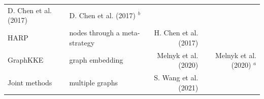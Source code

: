 \documentclass[10pt,oneside]{article}
\begin{document}
\begin{longtable}[]{@{}llrr@{}}
\begin{minipage}[t]{0.16\columnwidth}
D. Chen et al. (2017)\strut
\end{minipage} & \begin{minipage}[t]{0.32\columnwidth}\raggedleft
D. Chen et al. (2017) \(^b\)\strut
\end{minipage}\tabularnewline
\begin{minipage}[t]{0.11\columnwidth}\raggedright
HARP\strut
\end{minipage} & \begin{minipage}[t]{0.30\columnwidth}\raggedright
nodes through a meta-strategy\strut
\end{minipage} & \begin{minipage}[t]{0.16\columnwidth}\raggedleft
H. Chen et al. (2017)\strut
\end{minipage} & \begin{minipage}[t]{0.32\columnwidth}\raggedleft
\strut
\end{minipage}\tabularnewline
\begin{minipage}[t]{0.11\columnwidth}\raggedright
GraphKKE\strut
\end{minipage} & \begin{minipage}[t]{0.30\columnwidth}\raggedright
graph embedding\strut
\end{minipage} & \begin{minipage}[t]{0.16\columnwidth}\raggedleft
Melnyk et al. (2020)\strut
\end{minipage} & \begin{minipage}[t]{0.32\columnwidth}\raggedleft
Melnyk et al. (2020) \(^a\)\strut
\end{minipage}\tabularnewline
\begin{minipage}[t]{0.11\columnwidth}\raggedright
Joint methods\strut
\end{minipage} & \begin{minipage}[t]{0.30\columnwidth}\raggedright
multiple graphs\strut
\end{minipage} & \begin{minipage}[t]{0.16\columnwidth}\raggedleft
S. Wang et al. (2021)\strut
\end{minipage} & \begin{minipage}[t]{0.32\columnwidth}\raggedleft
\strut
\end{minipage}\tabularnewline
\bottomrule
\end{longtable}
\end{document}
